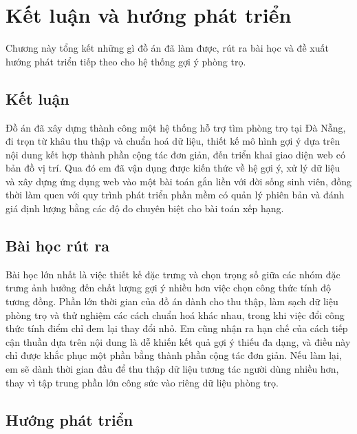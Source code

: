 \chapter{Kết luận và hướng phát triển}
\label{ch:ketluan}

\begin{muctieu}
Chương này tổng kết những gì đồ án đã làm được, rút ra bài học và đề xuất
hướng phát triển tiếp theo cho hệ thống gợi ý phòng trọ.
\end{muctieu}

\section{Kết luận}

Đồ án đã xây dựng thành công một hệ thống hỗ trợ tìm phòng trọ tại Đà Nẵng,
đi trọn từ khâu thu thập và chuẩn hoá dữ liệu, thiết kế mô hình gợi ý dựa
trên nội dung kết hợp thành phần cộng tác đơn giản, đến triển khai giao
diện web có bản đồ vị trí. Qua đó em đã vận dụng được kiến thức về hệ gợi
ý, xử lý dữ liệu và xây dựng ứng dụng web vào một bài toán gắn liền với đời
sống sinh viên, đồng thời làm quen với quy trình phát triển phần mềm có
quản lý phiên bản và đánh giá định lượng bằng các độ đo chuyên biệt cho
bài toán xếp hạng.

\section{Bài học rút ra}

Bài học lớn nhất là việc thiết kế đặc trưng và chọn trọng số giữa các nhóm
đặc trưng ảnh hưởng đến chất lượng gợi ý nhiều hơn việc chọn công thức tính
độ tương đồng. Phần lớn thời gian của đồ án dành cho thu thập, làm sạch dữ
liệu phòng trọ và thử nghiệm các cách chuẩn hoá khác nhau, trong khi việc
đổi công thức tính điểm chỉ đem lại thay đổi nhỏ. Em cũng nhận ra hạn chế
của cách tiếp cận thuần dựa trên nội dung là dễ khiến kết quả gợi ý thiếu
đa dạng, và điều này chỉ được khắc phục một phần bằng thành phần cộng tác
đơn giản. Nếu làm lại, em sẽ dành thời gian đầu để thu thập dữ liệu tương
tác người dùng nhiều hơn, thay vì tập trung phần lớn công sức vào riêng dữ
liệu phòng trọ.

\section{Hướng phát triển}

